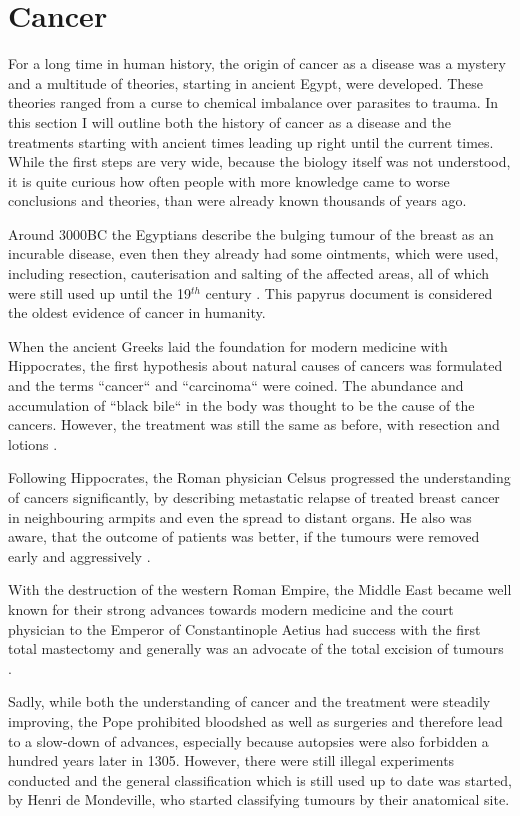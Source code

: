 \section{Cancer}
\label{intro-sec:cancer}

For a long time in human history, the origin of cancer as a disease was a mystery and a multitude of theories, starting in ancient Egypt, were developed. These theories ranged from a curse to chemical imbalance over parasites to trauma. In this section I will outline both the history of cancer as a disease and the treatments starting with ancient times leading up right until the current times. While the first steps are very wide, because the biology itself was not understood, it is quite curious how often people with more knowledge came to worse conclusions and theories, than were already known thousands of years ago.

Around 3000BC the Egyptians describe the bulging tumour of the breast as an incurable disease\cite{Breasted1930}, even then they already had some ointments, which were used, including resection, cauterisation and salting of the affected areas, all of which were still used up until the 19$^{th}$ century \cite{Hajdu2004}. This papyrus document is considered the oldest evidence of cancer in humanity.

When the ancient Greeks laid the foundation for modern medicine with Hippocrates, the first hypothesis about natural causes of cancers was formulated and the terms ``cancer`` and ``carcinoma`` were coined. The abundance and accumulation of ``black bile`` in the body was thought to be the cause of the cancers. However, the treatment was still the same as before, with resection and lotions \cite{Chadwick1950}.

Following Hippocrates, the Roman physician Celsus progressed the understanding of cancers significantly, by describing metastatic relapse of treated breast cancer in neighbouring armpits and even the spread to distant organs. He also was aware, that the outcome of patients was better, if the tumours were removed early and aggressively \cite{Celsus1939}.

With the destruction of the western Roman Empire, the Middle East became well known for their strong advances towards modern medicine and the court physician to the Emperor of Constantinople Aetius had success with the first total mastectomy and generally was an advocate of the total excision of tumours \cite{Browne2012}. 

Sadly, while both the understanding of cancer and the treatment were steadily improving, the Pope prohibited bloodshed as well as surgeries and therefore lead to a slow-down of advances, especially because autopsies were also forbidden a hundred years later in 1305. However, there were still illegal experiments conducted and the general classification which is still used up to date was started, by Henri de Mondeville, who started classifying tumours by their anatomical site\cite{Pilcher1895}.

